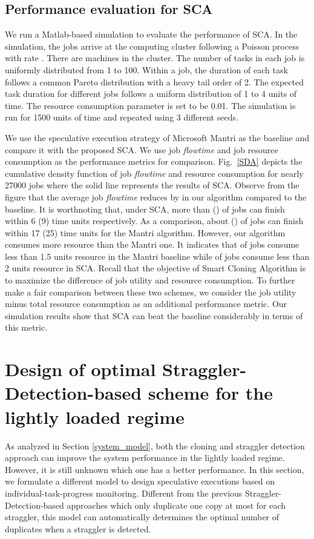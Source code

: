 \documentclass[10pt,conference]{IEEEtran}
\begin{document}
\subsection{Performance evaluation for SCA}
We run a Matlab-based simulation to evaluate the performance of SCA. In the simulation, the jobs arrive at the computing cluster following a Poisson process with rate . There are  machines in the cluster. The number of tasks in each job is uniformly distributed from 1 to 100. Within a job, the duration of each task follows a common Pareto distribution with a heavy tail order of 2. The expected task duration for different jobs follows a uniform distribution of 1 to 4 units of time.
The resource consumption parameter  is set to be 0.01.
The simulation is run for 1500 units of time and repeated using 3 different seeds.

We use the speculative execution strategy of Microsoft Mantri as the baseline and compare it with the proposed SCA. We use job \textit{flowtime} and job resource consumption as the performance metrics for comparison. Fig.~\ref{SDA} depicts the cumulative density function of job \textit{flowtime} and resource consumption for nearly 27000 jobs where the solid line represents the results of SCA.
Observe from the figure that the average job \textit{flowtime} reduces by  in our algorithm compared to the baseline. It is worthnoting that, under SCA, more than  () of jobs can finish within 6 (9) time units respectively.  As a comparison, about   () of jobs can finish within 17 (25) time units  for the Mantri algorithm. However, our algorithm consumes more resource than the Mantri one. It indicates that  of jobs consume less than 1.5 units resource in the Mantri baseline while  of jobs consume less than 2 units resource in SCA. Recall that the objective of Smart Cloning Algorithm is to maximize the difference of job utility and resource consumption. To further make a fair comparison between these two schemes, we  consider the job utility minus total resource consumption as an additional performance metric. Our simulation results show that SCA can beat the baseline considerably in terms of this metric.


\section{Design of optimal Straggler-Detection-based scheme for the lightly loaded regime}
\label{SDA_design}
As analyzed in Section \ref{system_model}, both the cloning and straggler detection approach can improve the system performance in the lightly loaded regime. However, it is still unknown which one has a better performance. In this section, we formulate a different model to design speculative executions based on individual-task-progress monitoring. Different from the previous Straggler-Detection-based approaches which only duplicate one copy at most for each straggler, this model can automatically determines the optimal number of duplicates when a straggler is detected.
\end{document}
